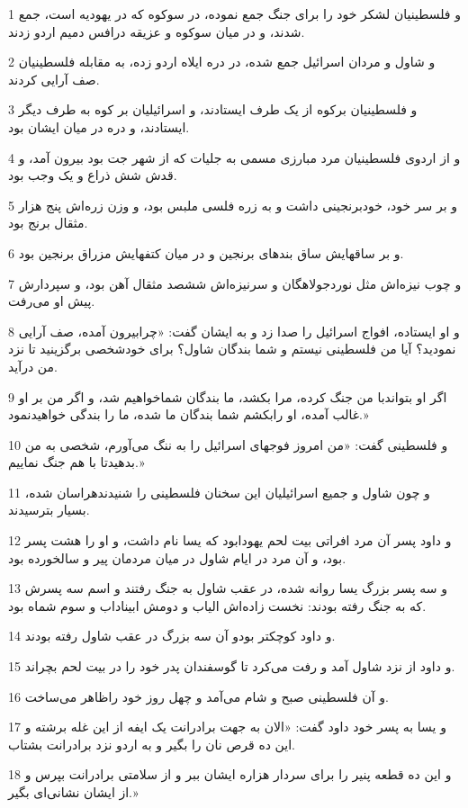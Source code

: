 \par 1 و فلسطینیان لشکر خود را برای جنگ جمع نموده، در سوکوه که در یهودیه است، جمع شدند، و در میان سوکوه و عزیقه درافس دمیم اردو زدند.
\par 2 و شاول و مردان اسرائیل جمع شده، در دره ایلاه اردو زده، به مقابله فلسطینیان صف آرایی کردند.
\par 3 و فلسطینیان برکوه از یک طرف ایستادند، و اسرائیلیان بر کوه به طرف دیگر ایستادند، و دره در میان ایشان بود.
\par 4 و از اردوی فلسطینیان مرد مبارزی مسمی به جلیات که از شهر جت بود بیرون آمد، و قدش شش ذراع و یک وجب بود.
\par 5 و بر سر خود، خودبرنجینی داشت و به زره فلسی ملبس بود، و وزن زره‌اش پنج هزار مثقال برنج بود.
\par 6 و بر ساقهایش ساق بندهای برنجین و در میان کتفهایش مزراق برنجین بود.
\par 7 و چوب نیزه‌اش مثل نوردجولاهگان و سرنیزه‌اش ششصد مثقال آهن بود، و سپردارش پیش او می‌رفت.
\par 8 و او ایستاده، افواج اسرائیل را صدا زد و به ایشان گفت: «چرابیرون آمده، صف آرایی نمودید؟ آیا من فلسطینی نیستم و شما بندگان شاول؟ برای خودشخصی برگزینید تا نزد من درآید.
\par 9 اگر او بتواندبا من جنگ کرده، مرا بکشد، ما بندگان شماخواهیم شد، و اگر من بر او غالب آمده، او رابکشم شما بندگان ما شده، ما را بندگی خواهیدنمود.»
\par 10 و فلسطینی گفت: «من امروز فوجهای اسرائیل را به ننگ می‌آورم، شخصی به من بدهیدتا با هم جنگ نماییم.»
\par 11 و چون شاول و جمیع اسرائیلیان این سخنان فلسطینی را شنیدندهراسان شده، بسیار بترسیدند.
\par 12 و داود پسر آن مرد افراتی بیت لحم یهودابود که یسا نام داشت، و او را هشت پسر بود، و آن مرد در ایام شاول در میان مردمان پیر و سالخورده بود.
\par 13 و سه پسر بزرگ یسا روانه شده، در عقب شاول به جنگ رفتند و اسم سه پسرش که به جنگ رفته بودند: نخست زاده‌اش الیاب و دومش ابیناداب و سوم شماه بود.
\par 14 و داود کوچکتر بودو آن سه بزرگ در عقب شاول رفته بودند.
\par 15 و داود از نزد شاول آمد و رفت می‌کرد تا گوسفندان پدر خود را در بیت لحم بچراند.
\par 16 و آن فلسطینی صبح و شام می‌آمد و چهل روز خود راظاهر می‌ساخت.
\par 17 و یسا به پسر خود داود گفت: «الان به جهت برادرانت یک ایفه از این غله برشته و این ده قرص نان را بگیر و به اردو نزد برادرانت بشتاب.
\par 18 و این ده قطعه پنیر را برای سردار هزاره ایشان ببر و از سلامتی برادرانت بپرس و از ایشان نشانی‌ای بگیر.»
